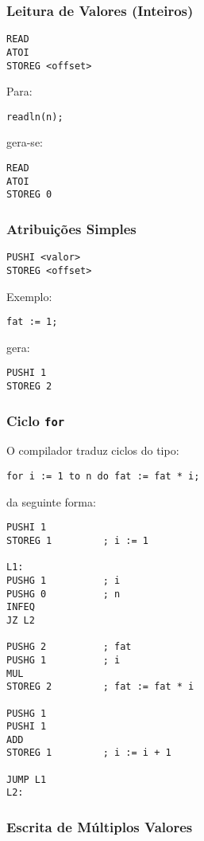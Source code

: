 \documentclass[12pt,a4paper]{report}%
\begin{document}
\subsubsection{Leitura de Valores (Inteiros)}

\begin{verbatim}
READ
ATOI
STOREG <offset>
\end{verbatim}

Para:
\begin{verbatim}
readln(n);
\end{verbatim}
gera-se:
\begin{verbatim}
READ
ATOI
STOREG 0
\end{verbatim}

\subsubsection{Atribuições Simples}

\begin{verbatim}
PUSHI <valor>
STOREG <offset>
\end{verbatim}

Exemplo:
\begin{verbatim}
fat := 1;
\end{verbatim}
gera:
\begin{verbatim}
PUSHI 1
STOREG 2
\end{verbatim}

\subsubsection{Ciclo \texttt{for}}

O compilador traduz ciclos do tipo:
\begin{verbatim}
for i := 1 to n do fat := fat * i;
\end{verbatim}
da seguinte forma:

\begin{verbatim}
PUSHI 1
STOREG 1         ; i := 1

L1:
PUSHG 1          ; i
PUSHG 0          ; n
INFEQ
JZ L2

PUSHG 2          ; fat
PUSHG 1          ; i
MUL
STOREG 2         ; fat := fat * i

PUSHG 1
PUSHI 1
ADD
STOREG 1         ; i := i + 1

JUMP L1
L2:
\end{verbatim}

\subsubsection{Escrita de Múltiplos Valores}
\end{document}

